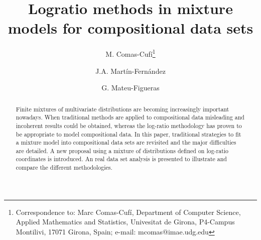 \documentclass[12pt, a4paper]{article}
\title{Logratio methods in mixture models for compositional data sets}
\author[1]{M. Comas-Cufí\thanks{Correspondence to: Marc Comas-Cufí, Department of Computer Science, Applied Mathematics and Statistics, Univesitat de Girona, P4-Campus Montilivi, 17071 Girona, Spain; e-mail: mcomas@imae.udg.edu}}%
\author[1]{J.A. Martín-Fernández}
\author[1]{G. Mateu-Figueras}
\affil[1]{\small Department of Computer Science, Applied Mathematics and Statistics, Universitat de Girona}
\begin{document}
\maketitle



\providecommand{\keywords}[1]{\textbf{Keywords:} #1}
\providecommand{\msc}[1]{\textbf{MSC2010:} #1}

\begin{abstract}
Finite mixtures of multivariate distributions are becoming increasingly important nowadays. When traditional methods are applied to compositional data misleading and incoherent results could be obtained, whereas the log-ratio methodology has proven to be appropriate to model compositional data. In this paper, traditional strategies to fit a mixture model into compositional data sets are revisited and the major difficulties are detailed. A new proposal using a mixture of distributions defined on log-ratio coordinates is introduced. An real data set analysis is presented to illustrate and compare the different methodologies.

\end{abstract}
\end{document}
